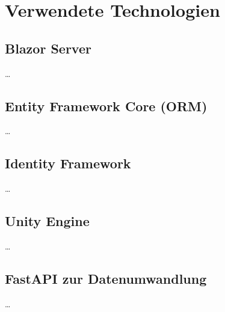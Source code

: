 \section{Verwendete Technologien}
\subsection*{Blazor Server}
\ldots
\subsection*{Entity Framework Core (ORM)}
\ldots
\subsection*{Identity Framework}
\ldots
\subsection*{Unity Engine}
\ldots
\subsection*{FastAPI zur Datenumwandlung}
\ldots
